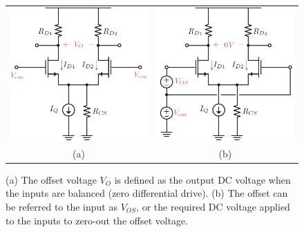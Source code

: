 \begin{figure}[tb]
\begin{center}
\begin{tabular}{cc}
\includegraphics[scale=1]{Diffamp_offset.pdf} &
\includegraphics[scale=1]{Diffamp_offset_input.pdf} \\
(a) & (b) \\
\end{tabular}
\end{center}
\caption{(a) The offset voltage $V_O$ is defined as the output DC voltage when the inputs are balanced (zero differential drive).  (b) The offset can be referred to the input as $V_{OS}$, or the required DC voltage applied to the inputs to zero-out the offset voltage.}
\label{fig:Diffamp_offset.pdf}
\end{figure}

